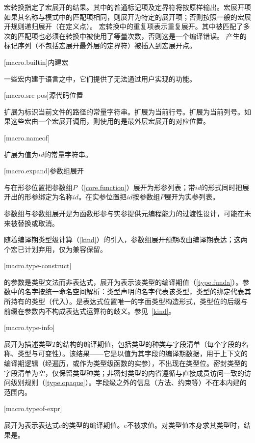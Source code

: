 \pnum
宏转换指定了宏展开的结果。其中的普通标记项及定界符将按原样输出。宏展开项如果其名称与模式中的匹配项相同，则展开为特定的展开项；否则按照一般的宏展开规则递归展开（在定义点）。
宏转换中的重复项表示重复展开。其中被匹配了多次的匹配项也必须在转换中被使用了等量次数，否则这是一个编译错误。
产生的标记序列（不包括宏展开最外层的定界符）被插入到宏展开点。

[macro.builtin]{内建宏}

\pnum
一些宏内建于语言之中，它们提供了无法通过用户实现的功能。

[macro.src-pos]{源代码位置}

\pnum
{}扩展为标识当前文件的路径的常量字符串。扩展为当前行号。扩展为当前列号。如果这些宏由一个宏展开调用，则使用的是最外层宏展开的对应位置。

[macro.nameof]{}

\pnum
{}扩展为值为$id$的常量字符串。

[macro.expand]{参数组展开}

\pnum
{}与在形参位置把参数组$P$（\ref{core.function}）展开为形参列表；带$id$的形式同时把展开出的形参绑定为名称$id$。在实参位置把$id$按参数组$P$展开为实参列表。

\pnum
\enternote 参数组与参数组展开是为函数形参与实参提供元编程能力的过渡性设计，可能在未来被替换或取消。 \exitnote

\pnum
随着编译期类型级计算（\ref{kind}）的引入，参数组展开预期改由编译期表达；这两个宏已计划弃用，仅为兼容保留。

[macro.type-construct]{}

\pnum
{}的参数是类型文法而非表达式，展开为表示该类型的编译期值（\ref{type.funda}）。参数中的名字按统一命名空间解析：类型声明的名字代表该类型，类型的绑定代表其所持有的类型（代入）。是表达式位置唯一的字面类型构造形式，类型位的后缀与前缀在参数内不构成表达式运算符的歧义。参见~\ref{kind}。

[macro.type-info]{}

\pnum
{}展开为描述类型$T$的结构的编译期值，包括类型的种类与字段清单（每个字段的名称、类型与可变性）。该结果——它是以值为其字段的编译期数据，用于上下文的编译期逻辑（经遍历，或作为类型级函数的实参），不出现在类型位。密封类型的字段清单为空，仅保留类型种类；非密封类型的内省遵循与直接成员访问一致的访问级别规则（\ref{type.opaque}）。字段级之外的信息（方法、约束等）不在本内建的范围内。

[macro.typeof-expr]{}

\pnum
{}展开为表示表达式$e$的类型的编译期值。$e$不被求值。对类型值本身求其类型时，结果是。